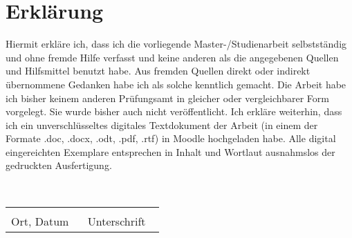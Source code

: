 \chapter*{Erklärung}

Hiermit erkläre ich, dass ich die vorliegende Master-/Studienarbeit selbstständig und ohne fremde Hilfe verfasst
und keine anderen als die angegebenen Quellen und Hilfsmittel benutzt habe.
Aus fremden Quellen direkt oder indirekt übernommene Gedanken habe ich als solche kenntlich gemacht.
Die Arbeit habe ich bisher keinem anderen Prüfungsamt in gleicher oder vergleichbarer Form vorgelegt.
Sie wurde bisher auch nicht veröffentlicht.
Ich erkläre weiterhin, dass ich ein unverschlüsseltes digitales Textdokument der Arbeit (in einem der Formate
.doc, .docx, .odt, .pdf, .rtf) in Moodle hochgeladen habe.
Alle digital eingereichten Exemplare entsprechen in Inhalt und Wortlaut ausnahmslos der gedruckten Ausfertigung.

\ \\[1cm]

\begin{tabular}{@{}p{0.45\linewidth}p{0.45\linewidth}@{}}
    \hrulefill & \hrulefill \\
    Ort, Datum & Unterschrift \\
\end{tabular}
\newpage
